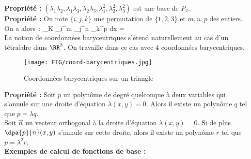%
{\bf Propri\'et\'e :} $(\lambda_1\lambda_2,\lambda_1\lambda_3,\lambda_2\lambda_3,\lambda_1^2,\lambda_2^2,\lambda_3^2)$ est une base de $P_2$.
\vspace*{5 mm}\\
%
{\bf Propri\'et\'e :} On note $\{i,j,k\}$ une permutation de $\{1,2,3\}$ et $m,n,p$ des entiers. On a alors~:
\be
\int_K \lambda_i^m \lambda_j^n \lambda_k^p \; dx = 
\ee
%
\vspace*{10 mm}\\
%
La notion de coordonn\'ees barycentriques s'\'etend naturellement au cas d'un t\'etra\`edre dans $\RR^3$. On travaille dans ce cas avec 4 coordonn\'ees barycentriques.


\begin{figure}[h]
\begin{center}
\texttt{[image: FIG/coord-barycentriques.jpg]}
\caption{Coordonn\'ees barycentriques sur un triangle}
\label{fig:coord-bar}
\end{center}
\end{figure}
%
%
\noindent
{\bf Propri\'et\'e :} Soit $p$ un polyn\^ome de degr\'e quelconque \`a
deux variables qui s'annule sur une droite d'\'equation $\lambda(x,y)=
0$. Alors il  existe un polyn\^ome $q$ tel que $p=\lambda q$.\\
Soit $\overrightarrow n$  un vecteur orthogonal \`a la droite 
d'\'equation $\lambda(x,y)=0$. Si de plus
$\displaystyle{\dpa{p}{n}(x,y)}$
s'annule sur cette droite, alors il existe un polyn\^ome $r$
tel que $p= \lambda^2 r$.
\vspace*{5mm}\\
%
%
%
\noindent
{\bf Exemples de calcul de fonctions de base :} 
